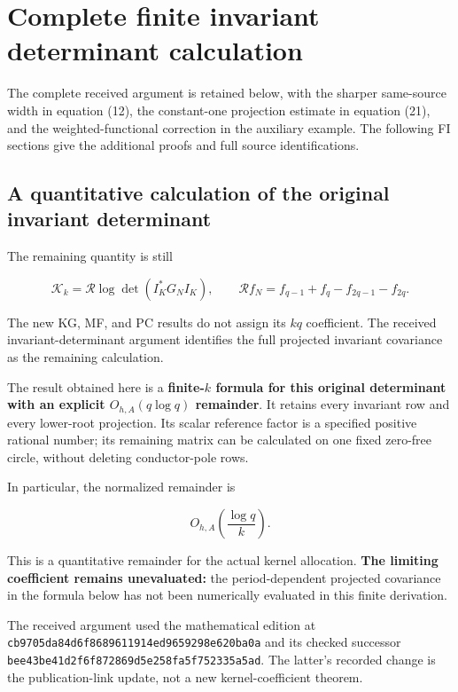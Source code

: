 \documentclass[11pt]{article}
\begin{document}
\section{Complete finite invariant determinant calculation}\label{complete-finite-invariant-determinant-calculation}

The complete received argument is retained below, with the sharper same-source width in equation (12), the constant-one projection estimate in equation (21), and the weighted-functional correction in the auxiliary example. The following FI sections give the additional proofs and full source identifications.

\subsection{A quantitative calculation of the original invariant determinant}\label{a-quantitative-calculation-of-the-original-invariant-determinant}

The remaining quantity is still

\[
\mathcal K_k
=
\mathcal R\log\det(I_K^*G_NI_K),
\qquad
\mathcal R f_N=f_{q-1}+f_q-f_{2q-1}-f_{2q}.
\]

The new KG, MF, and PC results do not assign its \(kq\) coefficient. The received invariant-determinant argument identifies the full projected invariant covariance as the remaining calculation.

The result obtained here is a \textbf{finite-\(k\) formula for this original determinant with an explicit \(O_{h,A}(q\log q)\) remainder}. It retains every invariant row and every lower-root projection. Its scalar reference factor is a specified positive rational number; its remaining matrix can be calculated on one fixed zero-free circle, without deleting conductor-pole rows.

In particular, the normalized remainder is

\[
O_{h,A}\!\left(\frac{\log q}{k}\right).
\]

This is a quantitative remainder for the actual kernel allocation. \textbf{The limiting coefficient remains unevaluated:} the period-dependent projected covariance in the formula below has not been numerically evaluated in this finite derivation.

The received argument used the mathematical edition at \nolinkurl{cb9705da84d6f8689611914ed9659298e620ba0a} and its checked successor \nolinkurl{bee43be41d2f6f872869d5e258fa5f752335a5ad}. The latter's recorded change is the publication-link update, not a new kernel-coefficient theorem.
\end{document}
